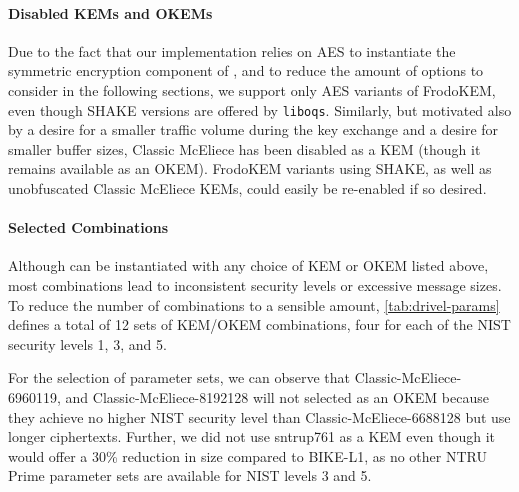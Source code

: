 \paragraph{Disabled KEMs and OKEMs}

Due to the fact that our implementation relies on AES to instantiate the symmetric encryption component of \drivel{}, and to reduce the amount of options to consider in the following sections, we support only AES variants of FrodoKEM, even though SHAKE versions are offered by \texttt{liboqs}.
Similarly, but motivated also by a desire for a smaller traffic volume during the key exchange and a desire for smaller buffer sizes, Classic McEliece has been disabled as a KEM (though it remains available as an OKEM).
FrodoKEM variants using SHAKE, as well as unobfuscated Classic McEliece KEMs, could easily be re-enabled if so desired.

\paragraph{Selected Combinations}

Although \drivel{} can be instantiated with any choice of KEM or OKEM listed above, most combinations lead to inconsistent security levels or excessive message sizes. To reduce the number of combinations to a sensible amount, \cref{tab:drivel-params} defines a total of 12 sets of KEM/OKEM combinations, four for each of the NIST security levels 1, 3, and 5.

For the selection of parameter sets, we can observe that Classic-McEliece-6960119, and Classic-McEliece-8192128 will not selected as an OKEM because they achieve no higher NIST security level than Classic-McEliece-6688128 but use longer ciphertexts.
Further, we did not use sntrup761 as a KEM even though it would offer a 30\% reduction in size compared to BIKE-L1, as no other NTRU Prime parameter sets are available for NIST levels 3 and 5.

